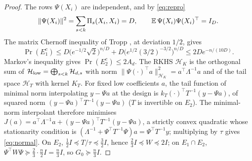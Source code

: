 \begin{proof}
The rows $\Psi(X_i)$ are independent, and by \eqref{eq:repro}
\[
\|\Psi(X_i)\|^2=\sum_{s<k}\Pi_s(X_i,X_i)=D,\qquad \mathbb{E}\,\Psi(X_i)\Psi(X_i)^\top=I_D .
\]
The matrix Chernoff inequality of Tropp \cite[Theorem~1.1]{Tropp12}, at deviation $1/2$, gives
\[
\Pr(E_1^c)\le D\big(e^{-1/2}\sqrt2\big)^{n/D}+D\big(e^{1/2}(3/2)^{-3/2}\big)^{n/D}\le2De^{-n/(10D)} .
\]
Markov's inequality gives $\Pr(E_2^c)\le2A_d$. The RKHS $\mathcal H_K$ is the orthogonal sum of
$\mathcal H_{\rm low}=\bigoplus_{s<k}\mathcal H_{d,s}$ with norm $\|\Psi(\cdot)^\top a\|^2_{\mathcal H_K}=a^\top\Lambda^{-1}a$
and of the tail space $\mathcal H_T$ with kernel $K_T$. For fixed low coefficients $a$, the tail function of
minimal norm interpolating $y-\Psi a$ at the design is $k_T(\cdot)^\top T^{-1}(y-\Psi a)$, of squared norm
$(y-\Psi a)^\top T^{-1}(y-\Psi a)$ ($T$ is invertible on $E_2$). The minimal-norm interpolant therefore
minimises $J(a)=a^\top\Lambda^{-1}a+(y-\Psi a)^\top T^{-1}(y-\Psi a)$, a strictly convex quadratic whose
stationarity condition is $(\Lambda^{-1}+\Psi^\top T^{-1}\Psi)a=\Psi^\top T^{-1}y$; multiplying by $\tau$ gives
\eqref{eq:normal}. On $E_2$, $\tfrac12I\preceq T/\tau\preceq\tfrac32I$, hence $\tfrac23I\preceq W\preceq2I$; on
$E_1\cap E_2$, $\Psi^\top W\Psi\succeq\tfrac23\cdot\tfrac n2I=\tfrac n3I$, so $G_0\succeq\tfrac n3I$.
\end{proof}

